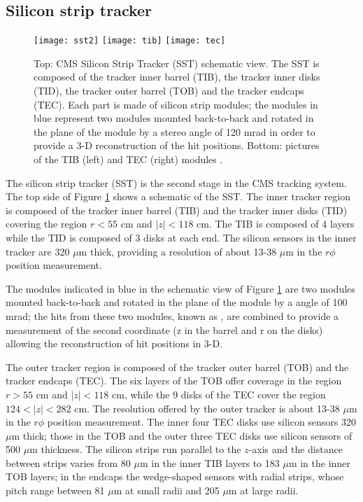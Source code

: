 \subsection{Silicon strip tracker}\label{sst}
\begin{figure}[h!]
  \centering
  \texttt{[image: sst2]}
  \texttt{[image: tib]}
  \texttt{[image: tec]}
  \caption[SST Schematic view.]{Top: CMS Silicon Strip Tracker (SST) schematic view. The SST is composed of the tracker inner barrel (TIB), the tracker inner disks (TID), the tracker outer barrel (TOB) and the tracker endcaps (TEC). Each part is made of silicon strip modules; the modules in blue represent two modules mounted back-to-back and rotated in the plane of the module by a stereo angle of 120 mrad in order to provide a 3-D reconstruction of the hit positions. Bottom: pictures of the TIB (left) and TEC (right) modules \cite{sst,tib,tec}.}
  \label{fig:sst}
\end{figure}

The silicon strip tracker (SST) is the second stage in the CMS tracking system. The top side of Figure \ref{fig:sst} shows a schematic of the SST. The inner tracker region is composed of the tracker inner barrel (TIB) and the tracker inner disks (TID) covering the region $r<55$ cm and $|z|<118$ cm. The TIB is composed of 4 layers while the TID is composed of 3 disks at each end. The silicon sensors in the inner tracker are 320 $\mu$m thick, providing a resolution of about 13-38 $\mu$m in the $r\phi$ position measurement.

The modules indicated in blue in the schematic view of Figure \ref{fig:sst} are two modules mounted back-to-back and rotated in the plane of the module by a  angle of 100 mrad; the hits from these two modules, known as , are combined to provide a measurement of the second coordinate (z in the barrel and r on the disks) allowing the reconstruction of hit positions in 3-D.

The outer tracker region is composed of the tracker outer barrel (TOB) and the tracker endcaps (TEC). The six layers of the TOB offer coverage in the region $r>55$ cm and $|z|<118$ cm, while the 9 disks of the TEC cover the region $124<|z|<282$ cm. The resolution offered by the outer tracker is about 13-38 $\mu$m in the $r\phi$ position measurement. The inner four TEC disks use silicon sensors 320 $\mu$m thick; those in the TOB and the outer three TEC disks use silicon sensors of 500 $\mu$m thickness. The silicon strips run parallel to the $z$-axis and the distance between strips varies from 80 $\mu$m in the inner TIB layers to 183 $\mu$m in the inner TOB layers; in the endcaps the wedge-shaped sensors with radial strips, whose pitch range between 81 $\mu$m at small radii and 205 $\mu$m at large radii.

